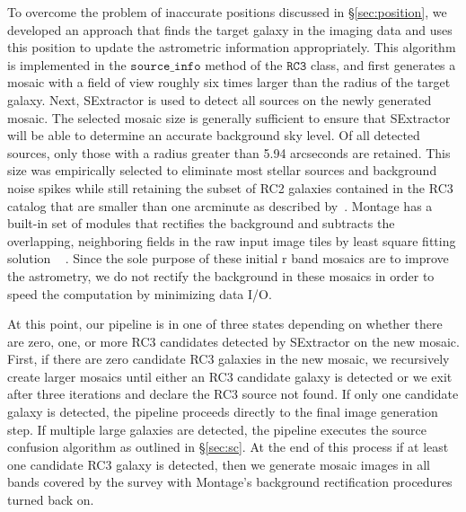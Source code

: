 \documentclass[authoryear, 12pt, 5p, times]{elsarticle}
\begin{document}
To overcome the problem of inaccurate positions discussed in \S\ref{sec:position}, we developed an approach that finds the target galaxy in the imaging data and uses this position to update the astrometric information appropriately. This algorithm is implemented in the $\texttt{source\_info}$ method of the $\texttt{RC3}$ class, and first generates a mosaic with a field of view roughly six times larger than the radius of the target galaxy.  Next, SExtractor is used to detect all sources on the newly generated mosaic. The selected mosaic size is generally sufficient to ensure that SExtractor will be able to determine an accurate background sky level. Of all detected sources, only those with a radius greater than 5.94 arcseconds are retained. This size was empirically selected to eliminate most stellar sources and background noise spikes while still retaining the subset of RC2 galaxies contained in the RC3 catalog that are smaller than one arcminute as described by~\citealp{rc2}. Montage has a built-in set of modules that rectifies the background and subtracts the overlapping, neighboring fields in the raw input image tiles by least square fitting solution ~\citep{montage} . Since the sole purpose of these initial r band mosaics are to improve the astrometry, we do not rectify the background in these mosaics in order to speed the computation by minimizing data I/O.

At this point, our pipeline is in one of three states depending on whether there are zero, one, or more RC3 candidates detected by SExtractor on the new mosaic. First, if there are zero candidate RC3 galaxies in the new mosaic, we recursively create larger mosaics until either an RC3 candidate galaxy is detected or we exit after three iterations and declare the RC3 source not found. If only one candidate galaxy is detected, the pipeline proceeds directly to the final image generation step. If multiple large galaxies are detected, the pipeline executes the source confusion algorithm as outlined in \S\ref{sec:sc}. At the end of this process if at least one candidate RC3 galaxy is detected, then we generate mosaic images in all bands covered by the survey with Montage's background rectification procedures turned back on.
\end{document}
